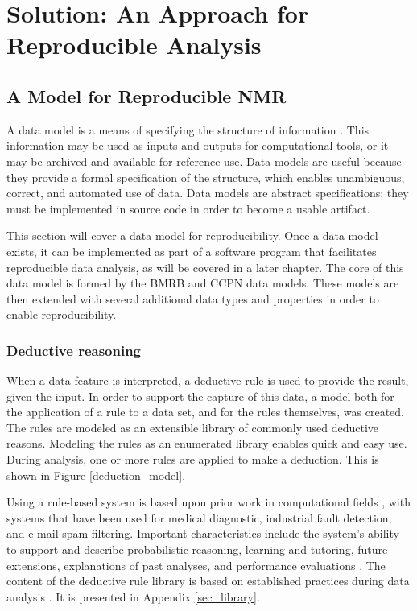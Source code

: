 \chapter{Solution: An Approach for Reproducible Analysis}


\section{A Model for Reproducible NMR}

A data model is a means of specifying the structure of information  
\cite{codd1970relational}.  This
information may be used as inputs and outputs for computational tools, or
it may be archived and available for reference use.  Data models are useful
because they provide a formal specification of the structure, which enables
unambiguous, correct, and automated use of data.  Data models are
abstract specifications; they must be implemented in source code in order
to become a usable artifact.

This section will cover a data model for reproducibility.  Once a data
model exists, it can be implemented as part of a software program that
facilitates reproducible data analysis, as will be covered in a later 
chapter.  The core of this data model is formed by the BMRB \cite{bmrb}
and CCPN \cite{ccpn} data models.  These models are then extended with
several additional data types and properties in order to enable 
reproducibility.


\subsection*{Deductive reasoning}
When a data feature is interpreted, a deductive rule is used to provide
the result, given the input.  In order to support the capture of this data, 
a model both for the application of a rule to a data set, and for the rules
themselves, was created.  The rules are modeled as an extensible library of 
commonly used deductive reasons.  Modeling the rules as an enumerated library 
enables quick and easy use.  During analysis, one or more rules are applied to 
make a deduction.  This is shown in Figure \ref{deduction_model}.

Using a rule-based system is based upon prior work in computational fields
\cite{buchanan1984rule, reiter1987theory}, with systems that have been used for 
medical diagnostic, industrial fault detection, and e-mail spam filtering.
Important characteristics include the system's ability to support and describe
probabilistic reasoning, learning and tutoring, future extensions, explanations
of past analyses, and performance evaluations \cite{buchanan1984rule}.
The content of the deductive rule library is based on 
established practices during data analysis \cite{guerry2011automated, hncacb,
hnco, cbcaconh, hbhaconh, picky, xeasy, sparky, ccpn}.
It is presented in Appendix \ref{sec_library}.



